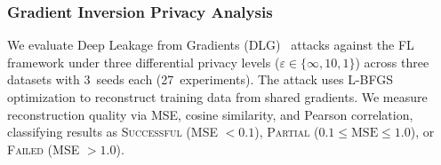 \documentclass[conference]{IEEEtran}
\begin{document}
\subsubsection{Gradient Inversion Privacy Analysis}
\label{sec:gradient_inversion}

We evaluate Deep Leakage from Gradients (DLG)~\cite{zhu2019deep} attacks against the FL framework under three differential privacy levels ($\varepsilon \in \{\infty, 10, 1\}$) across three datasets with 3~seeds each (27~experiments). The attack uses L-BFGS optimization to reconstruct training data from shared gradients. We measure reconstruction quality via MSE, cosine similarity, and Pearson correlation, classifying results as \textsc{Successful} (MSE $< 0.1$), \textsc{Partial} ($0.1 \leq \text{MSE} \leq 1.0$), or \textsc{Failed} (MSE $> 1.0$).
\end{document}
